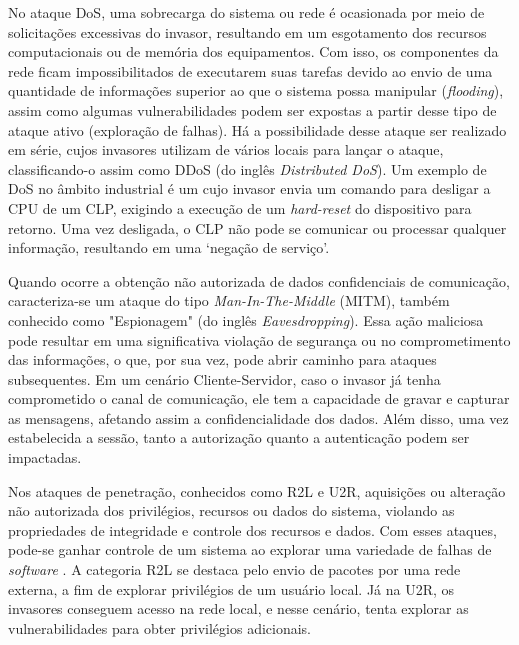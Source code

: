     No ataque DoS, uma sobrecarga do sistema ou rede é ocasionada por meio de solicitações excessivas do invasor, resultando em um esgotamento dos recursos computacionais ou de memória dos equipamentos. Com isso, os componentes da rede ficam impossibilitados de executarem suas tarefas devido ao envio de uma quantidade de informações superior ao que o sistema possa manipular (\textit{flooding}), assim como algumas vulnerabilidades podem ser expostas a partir desse tipo de ataque ativo (exploração de falhas). Há a possibilidade desse ataque ser realizado em série, cujos invasores utilizam de vários locais para lançar o ataque, classificando-o assim como DDoS (do inglês \textit{Distributed DoS}). Um exemplo de DoS no âmbito industrial é um cujo invasor envia um comando para desligar a CPU de um CLP, exigindo a execução de um \textit{hard-reset} do dispositivo para retorno. Uma vez desligada, o CLP não pode se comunicar ou processar qualquer informação, resultando em uma `negação de serviço'.

    Quando ocorre a obtenção não autorizada de dados confidenciais de comunicação, caracteriza-se um ataque do tipo \textit{Man-In-The-Middle} (MITM), também conhecido como "Espionagem" (do inglês \textit{Eavesdropping}). Essa ação maliciosa pode resultar em uma significativa violação de segurança ou no comprometimento das informações, o que, por sua vez, pode abrir caminho para ataques subsequentes. Em um cenário Cliente-Servidor, caso o invasor já tenha comprometido o canal de comunicação, ele tem a capacidade de gravar e capturar as mensagens, afetando assim a confidencialidade dos dados. Além disso, uma vez estabelecida a sessão, tanto a autorização quanto a autenticação podem ser impactadas.

    Nos ataques de penetração, conhecidos como R2L e U2R, aquisições ou alteração não autorizada dos privilégios, recursos ou dados do sistema, violando as propriedades de integridade e controle dos recursos e dados. Com esses ataques, pode-se ganhar controle de um sistema ao explorar uma variedade de falhas de \textit{software} \cite{turcato2020}. A categoria R2L se destaca pelo envio de pacotes por uma rede externa, a fim de explorar privilégios de um usuário local. Já na U2R, os invasores conseguem acesso na rede local, e nesse cenário, tenta explorar as vulnerabilidades para obter privilégios adicionais.


